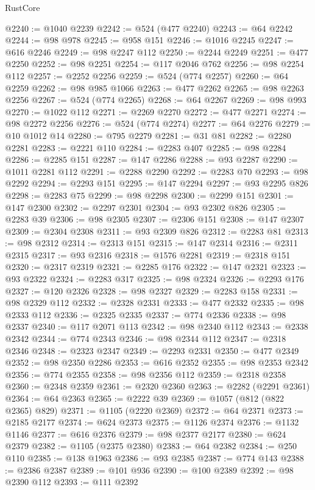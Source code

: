 \begin{lexlean}{RustCore}
\begin{coremodule}
@2240 := @1040 @2239
@2242 := @524 (@477 @2240)
@2243 := @64 @2242
@2244 := @98 @978
@2245 := @958 @151
@2246 := @1016 @2245
@2247 := @616 @2246
@2249 := @98 @2247 @112
@2250 := @2244 @2249
@2251 := @477 @2250
@2252 := @98 @2251
@2254 := @117 @2046 @762
@2256 := @98 @2254 @112
@2257 := @2252 @2256
@2259 := @524 (@774 @2257)
@2260 := @64 @2259
@2262 := @98 @985 @1066
@2263 := @477 @2262
@2265 := @98 @2263 @2256
@2267 := @524 (@774 @2265)
@2268 := @64 @2267
@2269 := @98 @993
@2270 := @1022 @112
@2271 := @2269 @2270
@2272 := @477 @2271
@2274 := @98 @2272 @2256
@2276 := @524 (@774 @2274)
@2277 := @64 @2276
@2279 := @10 @1012 @14
@2280 := @795 @2279
@2281 := @31 @81
@2282 := @2280 @2281
@2283 := @2221 @110
@2284 := @2283 @407
@2285 := @98 @2284
@2286 := @2285 @151
@2287 := @147 @2286
@2288 := @93 @2287
@2290 := @1011 @2281 @112
@2291 := @2288 @2290
@2292 := @2283 @70
@2293 := @98 @2292
@2294 := @2293 @151
@2295 := @147 @2294
@2297 := @93 @2295 @826
@2298 := @2283 @75
@2299 := @98 @2298
@2300 := @2299 @151
@2301 := @147 @2300
@2302 := @2297 @2301
@2304 := @93 @2302 @826
@2305 := @2283 @39
@2306 := @98 @2305
@2307 := @2306 @151
@2308 := @147 @2307
@2309 := @2304 @2308
@2311 := @93 @2309 @826
@2312 := @2283 @81
@2313 := @98 @2312
@2314 := @2313 @151
@2315 := @147 @2314
@2316 := @2311 @2315
@2317 := @93 @2316
@2318 := @1576 @2281
@2319 := @2318 @151
@2320 := @2317 @2319
@2321 := @2285 @176
@2322 := @147 @2321
@2323 := @93 @2322
@2324 := @2283 @317
@2325 := @98 @2324
@2326 := @2293 @176
@2327 := @120 @2326
@2328 := @98 @2327
@2329 := @2283 @158
@2331 := @98 @2329 @112
@2332 := @2328 @2331
@2333 := @477 @2332
@2335 := @98 @2333 @112
@2336 := @2325 @2335
@2337 := @774 @2336
@2338 := @98 @2337
@2340 := @117 @2071 @113
@2342 := @98 @2340 @112
@2343 := @2338 @2342
@2344 := @774 @2343
@2346 := @98 @2344 @112
@2347 := @2318 @2346
@2348 := @2323 @2347
@2349 := @2293 @2331
@2350 := @477 @2349
@2352 := @98 @2350 @2286
@2353 := @616 @2352
@2355 := @98 @2353 @2342
@2356 := @774 @2355
@2358 := @98 @2356 @112
@2359 := @2318 @2358
@2360 := @2348 @2359
@2361 := @2320 @2360
@2363 := @2282 (@2291 @2361)
@2364 := @64 @2363
@2365 := @2222 @39
@2369 := @1057 (@812 (@822 @2365) @829)
@2371 := @1105 (@2220 @2369)
@2372 := @64 @2371
@2373 := @2185 @2177
@2374 := @624 @2373
@2375 := @1126 @2374
@2376 := @1132 @1146
@2377 := @616 @2376
@2379 := @98 @2377 @2177
@2380 := @624 @2379
@2382 := @1105 (@2375 @2380)
@2383 := @64 @2382
@2384 := @250 @110
@2385 := @138 @1963
@2386 := @93 @2385
@2387 := @774 @143
@2388 := @2386 @2387
@2389 := @101 @936
@2390 := @100 @2389
@2392 := @98 @2390 @112
@2393 := @111 @2392

\end{coremodule}
\end{lexlean}
